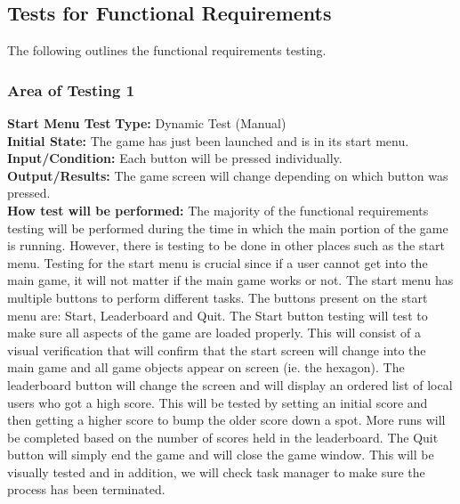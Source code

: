 \documentclass[12pt, titlepage]{article}
\begin{document}
\subsection{Tests for Functional Requirements}
\noindent The following outlines the functional requirements testing.
\subsubsection{Area of Testing 1}
\noindent \textbf{Start Menu Test}
\textbf{Type:}  Dynamic Test (Manual)\\
\textbf{Initial State:}  The game has just been launched and is in its start menu.\\
\textbf{Input/Condition:} Each button will be pressed individually.\\
\textbf{Output/Results:} The game screen will change depending on which button                      was  pressed.\\
\textbf{How test will be performed:} The majority of the functional requirements testing will be performed during the time in which the main portion of the game is running. However, there is testing to be done in other places such as the start menu. Testing for the start menu is crucial since if a user cannot get into the main game, it will not matter if the main game works or not. The start menu has multiple buttons to perform different tasks. The buttons present on the start menu are: Start, Leaderboard and Quit. The Start button testing will test to make sure all aspects of the game are loaded properly. This will consist of a visual verification that will confirm that the start screen will change into the main game and all game objects appear on screen (ie. the hexagon). The leaderboard button will change the screen and will display an ordered list of local users who got a high score. This will be tested by setting an initial score and then getting a higher score to bump the older score down a spot. More runs will be completed based on the number of scores held in the leaderboard. The Quit button will simply end the game and will close the game window. This will be visually tested and in addition, we will check task manager to make sure the process has been terminated.
\end{document}
